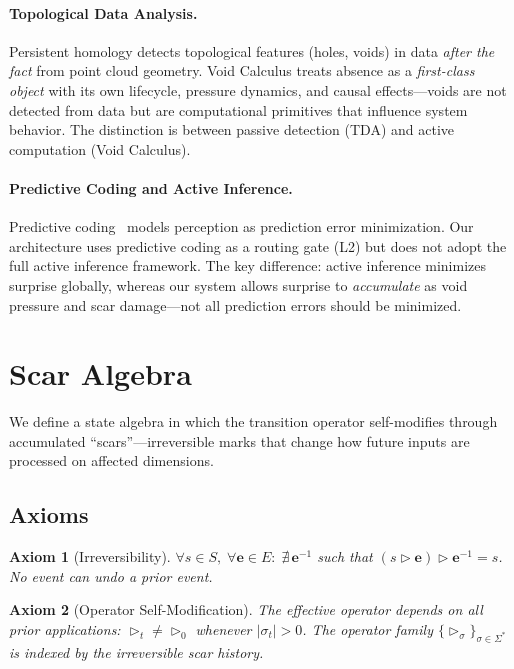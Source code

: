 \documentclass[11pt]{article}
\newtheorem{axiom}{Axiom}[section]
\begin{document}
\paragraph{Topological Data Analysis.}
Persistent homology detects topological features (holes, voids) in data \emph{after the fact} from point cloud geometry. Void Calculus treats absence as a \emph{first-class object} with its own lifecycle, pressure dynamics, and causal effects---voids are not detected from data but are computational primitives that influence system behavior. The distinction is between passive detection (TDA) and active computation (Void Calculus).

\paragraph{Predictive Coding and Active Inference.}
Predictive coding~\cite{friston2010} models perception as prediction error minimization. Our architecture uses predictive coding as a routing gate (L2) but does not adopt the full active inference framework. The key difference: active inference minimizes surprise globally, whereas our system allows surprise to \emph{accumulate} as void pressure and scar damage---not all prediction errors should be minimized.

\section{Scar Algebra}
\label{sec:scar}

We define a state algebra in which the transition operator self-modifies through accumulated ``scars''---irreversible marks that change how future inputs are processed on affected dimensions.

\subsection{Axioms}

\begin{axiom}[Irreversibility]
\label{ax:scar-irrev}
$\forall s \in S,\; \forall \mathbf{e} \in E:\; \nexists\, \mathbf{e}^{-1}$ such that $(s \triangleright \mathbf{e}) \triangleright \mathbf{e}^{-1} = s$. No event can undo a prior event.
\end{axiom}

\begin{axiom}[Operator Self-Modification]
\label{ax:scar-selfmod}
The effective operator depends on all prior applications: $\triangleright_t \neq \triangleright_0$ whenever $|\sigma_t| > 0$. The operator family $\{\triangleright_\sigma\}_{\sigma \in \Sigma^*}$ is indexed by the irreversible scar history.
\end{axiom}
\end{document}

